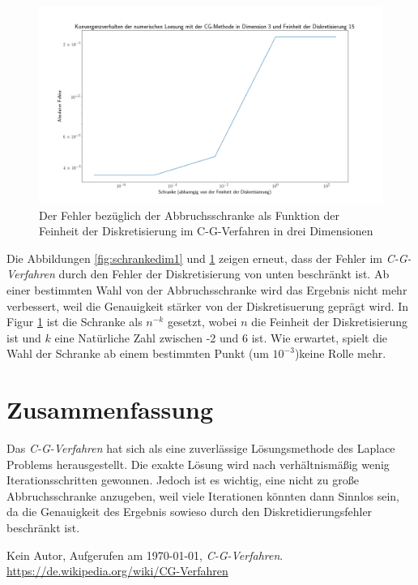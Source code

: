 \documentclass[smallheadings]{scrartcl}
\numberwithin{equation}{section}
\begin{document}
 \begin{figure}[H]
 	\centering
 	\includegraphics[width=\linewidth]{Bilder/loglogdim3}
 	\caption{Der Fehler bezüglich der Abbruchsschranke als Funktion der Feinheit der Diskretisierung im C-G-Verfahren in drei Dimensionen}
 	\label{fig:loglog3}
 \end{figure}

Die Abbildungen \ref{fig:schrankedim1} und \ref{fig:loglog3} zeigen erneut, dass der Fehler im \textit{C-G-Verfahren} durch den Fehler der Diskretisierung von unten beschränkt ist. Ab einer bestimmten Wahl von der Abbruchsschranke wird das Ergebnis nicht mehr verbessert, weil die Genauigkeit stärker von der Diskretisuerung geprägt wird. In Figur \ref{fig:loglog3} ist die Schranke als $n^{-k}$ gesetzt, wobei $n$ die Feinheit der Diskretisierung ist und $k$ eine Natürliche Zahl zwischen -2 und 6 ist. Wie erwartet, spielt die Wahl der Schranke ab einem bestimmten Punkt (um $10^{-3}$)keine Rolle mehr.

\section{Zusammenfassung}

Das \textit{C-G-Verfahren} hat sich als eine zuverlässige Lösungsmethode des Laplace Problems herausgestellt. Die exakte Lösung wird nach verhältnismäßig wenig Iterationsschritten gewonnen. Jedoch ist es wichtig, eine nicht zu große Abbruchsschranke anzugeben, weil viele Iterationen könnten dann Sinnlos sein, da die Genauigkeit des Ergebnis sowieso durch den Diskretidierungsfehler beschränkt ist.

\begin{thebibliography}{9}
 Kein Autor, Aufgerufen am \today, \textit{C-G-Verfahren}. 
\url{https://de.wikipedia.org/wiki/CG-Verfahren}
\end{thebibliography}


\end{document}

